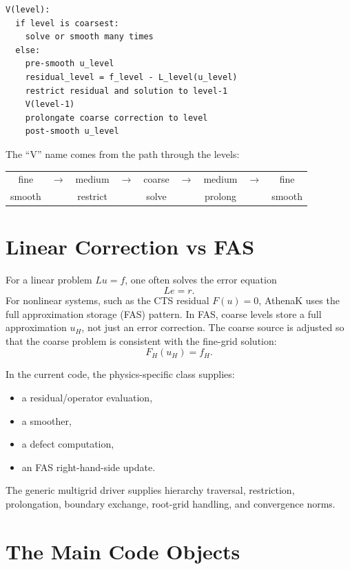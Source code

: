 \documentclass[11pt]{article}
\begin{document}
\begin{lstlisting}
V(level):
  if level is coarsest:
    solve or smooth many times
  else:
    pre-smooth u_level
    residual_level = f_level - L_level(u_level)
    restrict residual and solution to level-1
    V(level-1)
    prolongate coarse correction to level
    post-smooth u_level
\end{lstlisting}

The ``V'' name comes from the path through the levels:

\begin{center}
\begin{tabular}{ccccccccc}
fine & $\rightarrow$ & medium & $\rightarrow$ & coarse & $\rightarrow$ & medium & $\rightarrow$ & fine \\
smooth & & restrict & & solve & & prolong & & smooth
\end{tabular}
\end{center}

\section{Linear Correction vs FAS}

For a linear problem \(Lu=f\), one often solves the error equation
\[
  L e = r.
\]
For nonlinear systems, such as the CTS residual \(F(u)=0\), AthenaK uses the
full approximation storage (FAS) pattern.  In FAS, coarse levels store a full
approximation \(u_H\), not just an error correction.  The coarse source is adjusted
so that the coarse problem is consistent with the fine-grid solution:
\[
  F_H(u_H) = f_H.
\]

In the current code, the physics-specific class supplies:
\begin{itemize}
  \item a residual/operator evaluation,
  \item a smoother,
  \item a defect computation,
  \item an FAS right-hand-side update.
\end{itemize}

The generic multigrid driver supplies hierarchy traversal, restriction,
prolongation, boundary exchange, root-grid handling, and convergence norms.

\section{The Main Code Objects}
\end{document}
